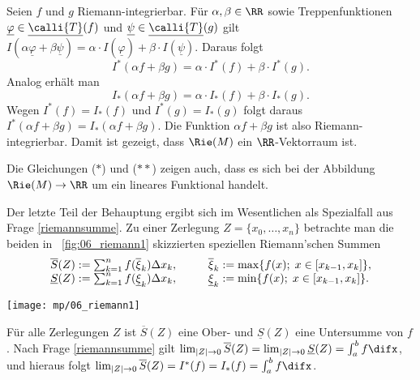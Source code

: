 \begin{antwort}
Seien $f$ und $g$ Riemann-integrierbar. 
Für $\alpha,\beta\in\RR$ sowie Treppenfunktionen 
$\underline{\varphi} \in \underline{\calli{T}}(f)$ und  
$\underline{\psi} \in \underline{\calli{T}}(g)$  
gilt 
$I( \alpha \underline{\varphi} + \beta \underline{\psi} ) = 
\alpha \cdot I(  \underline{\varphi} ) + 
\beta \cdot  I ( \underline{ \psi } )$. 
Daraus folgt 
\begin{equation}
I^* (\alpha f + \beta g ) = 
\alpha\cdot I^*( f ) + 
\beta\cdot I^*( g ).
\tag{$\ast$}
\end{equation}
Analog erhält man   
\begin{equation}
I_*  (\alpha f + \beta g ) = 
\alpha\cdot I_*(  f ) + 
\beta\cdot I_*( g ).
\tag{$\ast\ast$}
\end{equation}
Wegen $I^*( f )=I_*(f)$ und $I^*( g )=I_*(g)$ folgt daraus 
$I^*( \alpha f+ \beta g )=I_*(\alpha f+\beta g)$. Die Funktion 
$\alpha f+\beta g$ ist also Riemann-integrierbar. 
Damit ist gezeigt, dass $\Rie(M)$ ein $\RR$-Vektorraum ist.  

Die Gleichungen ($\ast$) und ($\ast\ast$) zeigen auch, 
dass es sich bei der Abbildung 
$\Rie(M) \to \RR$ um ein lineares Funktional handelt. 

Der letzte Teil der Behauptung ergibt sich im Wesentlichen als 
Spezialfall aus Frage \ref{riemannsumme}. Zu einer Zerlegung 
$Z=\{x_0,\ldots,x_n\}$ betrachte man die beiden in 
\Abb~\ref{fig:06_riemann1} skizzierten speziellen Riemann'schen Summen 
\[
\begin{array}{lp{3mm}l}
\overline{S}(Z)  := \sum_{k=1}^n f(\overline{\xi}_k) \Delta x_k,  & &
\overline{\xi}_k := \max\{ f(x); \; x\in [x_{k-1},x_k] \}, \\
\underline{S}(Z) := \sum_{k=1}^n f(\underline{\xi}_k) \Delta x_k,  
& &
\underline{\xi}_k := \min\{ f(x); \; x\in [x_{k-1},x_k] \}.
\end{array}
\]

\begin{center}
  \texttt{[image: mp/06\_riemann1]}
  \label{fig:06_riemann1}
\end{center}

Für alle Zerlegungen $Z$ ist  
$\overline{S}(Z)$ eine Ober- und $\underline{S}(Z)$ eine 
Untersumme von $f$. Nach Frage \ref{riemannsumme} gilt 
$\lim_{|Z|\to 0} \overline{S}(Z)=\lim_{|Z|\to 0 }\underline{S}(Z) 
= \int_a^b f \difx$, und hieraus folgt 
$\lim_{|Z|\to 0} \overline{S}(Z)=I^*(f)=I_*(f)=\int_a^b f \difx$. 
\AntEnd
\end{antwort}

